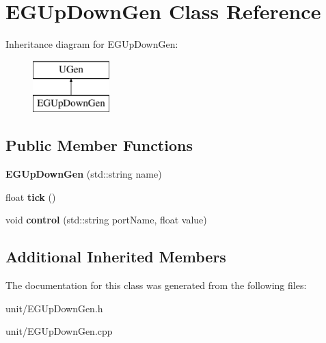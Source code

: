 \hypertarget{classEGUpDownGen}{}\section{E\+G\+Up\+Down\+Gen Class Reference}
\label{classEGUpDownGen}
Inheritance diagram for E\+G\+Up\+Down\+Gen\+:\begin{figure}[H]
\begin{center}
\leavevmode
\includegraphics[height=2.000000cm]{classEGUpDownGen}
\end{center}
\end{figure}
\subsection*{Public Member Functions}
\begin{DoxyCompactItemize}
\item 
{\bfseries E\+G\+Up\+Down\+Gen} (std\+::string name)\hypertarget{classEGUpDownGen_abc35a572da36fa26f4b54beabfc6268e}{}\label{classEGUpDownGen_abc35a572da36fa26f4b54beabfc6268e}

\item 
float {\bfseries tick} ()\hypertarget{classEGUpDownGen_abea11de5389345064a8395d54411e3b3}{}\label{classEGUpDownGen_abea11de5389345064a8395d54411e3b3}

\item 
void {\bfseries control} (std\+::string port\+Name, float value)\hypertarget{classEGUpDownGen_ac1ef59d9023034c17b46e09bfae15178}{}\label{classEGUpDownGen_ac1ef59d9023034c17b46e09bfae15178}

\end{DoxyCompactItemize}
\subsection*{Additional Inherited Members}


The documentation for this class was generated from the following files\+:\begin{DoxyCompactItemize}
\item 
unit/E\+G\+Up\+Down\+Gen.\+h\item 
unit/E\+G\+Up\+Down\+Gen.\+cpp\end{DoxyCompactItemize}
